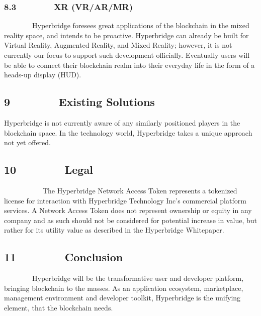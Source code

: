 \documentclass[]{article}
\begin{document}
\hypertarget{h.kh7k2j9rg21u}{%
\subsubsection{\texorpdfstring{{8.3~~~~~~~~XR
(VR/AR/MR)}}{8.3~~~~~~~~XR (VR/AR/MR)}}\label{h.kh7k2j9rg21u}}

{~~~~~~~~Hyperbridge foresees great applications of the blockchain in
the mixed reality space, and intends to be proactive. Hyperbridge can
already be built for Virtual Reality, Augmented Reality, and Mixed
Reality; however, it is not currently our focus to support such
development officially. Eventually users will be able to connect their
blockchain realm into their everyday life in the form of a heads-up
display (HUD).}

\hypertarget{h.p22xyrugj08v}{%
\subsection{\texorpdfstring{{9~~~~~~~~Existing
Solutions}}{9~~~~~~~~Existing Solutions}}\label{h.p22xyrugj08v}}

{Hyperbridge is not currently aware of any similarly positioned players
in the blockchain space. In the technology world, Hyperbridge takes a
unique approach not yet offered.}

{}

\hypertarget{h.b8e6udtezd1d}{%
\subsection{\texorpdfstring{{10~~~~~~~~Legal}}{10~~~~~~~~Legal}}\label{h.b8e6udtezd1d}}

{~ ~ ~ ~ ~ ~ ~The Hyperbridge Network Access Token represents a
tokenized license for interaction with Hyperbridge Technology Inc's
commercial platform services. A Network Access Token does not represent
ownership or equity in any company and as such should not be considered
for potential increase in value, but rather for its utility value as
described in the Hyperbridge Whitepaper.}

{}

\hypertarget{h.1mof4p3a8sna}{%
\subsection{\texorpdfstring{{11~~~~~~~~Conclusion}}{11~~~~~~~~Conclusion}}\label{h.1mof4p3a8sna}}

{~~~~~~~~Hyperbridge will be the transformative user and developer
platform, bringing blockchain to the masses. As an application
ecosystem, marketplace, management environment and developer toolkit,
Hyperbridge is the unifying element, that the blockchain needs.}
\end{document}
